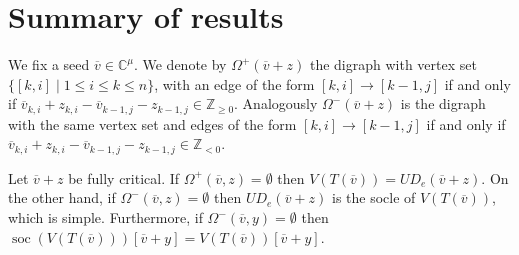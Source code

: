\documentclass[11pt,fleqn]{amsart}
\newcommand\CC{\mathbb C}
\newcommand\ZZ{\mathbb Z}
\renewcommand\to{\rightarrow}
\newcommand\vv{\overline{v}}
\begin{document}
\newpage
\section*{Summary of results}

We fix a seed $\vv \in \CC^\mu$. We denote by $\Omega^+(\vv + z)$ the digraph 
with vertex set $\{[k,i] \mid 1 \leq i \leq k \leq n\}$, with an edge of 
the form $[k,i] \to [k-1,j]$ if and only if $\vv_{k,i} + z_{k,i} - \vv_{k-1,j} 
- z_{k-1,j} \in \ZZ_{\geq 0}$. Analogously $\Omega^-(\vv + z)$ is the digraph 
with the same vertex set and edges of the form $[k,i] \to [k-1,j]$ if and only 
if $\vv_{k,i} + z_{k,i} - \vv_{k-1,j} - z_{k-1,j} \in \ZZ_{< 0}$.

\begin{Proposition*}
Let $\vv + z$ be fully critical.
If $\Omega^+(\vv, z) = \emptyset$ then $V(T(\vv)) = U D_e(\vv + z)$. On the 
other hand, if  $\Omega^-(\vv, z) = \emptyset$ then $U D_e(\vv + z)$ is the 
socle of $V(T(\vv))$, which is simple. Furthermore, if $\Omega^-(\vv, y) = 
\emptyset$ then $\operatorname{soc} (V(T(\vv))) [\vv + y]= V(T(\vv))[\vv + y]$.
\end{Proposition*}
\end{document}
